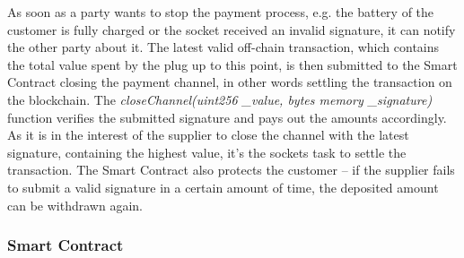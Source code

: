As soon as a party wants to stop the payment process, e.g. the battery of the customer is fully charged or the socket received an invalid signature, it can notify the other party about it. The latest valid off-chain transaction, which contains the total value spent by the plug up to this point, is then submitted to the Smart Contract closing the payment channel, in other words settling the transaction on the blockchain. The \textit{closeChannel(uint256 \_value, bytes memory \_signature)} function verifies the submitted signature and pays out the amounts accordingly.
\\
As it is in the interest of the supplier to close the channel with the latest signature, containing the highest value, it’s the sockets task to settle the transaction. The Smart Contract also protects the customer – if the supplier fails to submit a valid signature in a certain amount of time, the deposited amount can be withdrawn again.

\subsubsection{Smart Contract}
